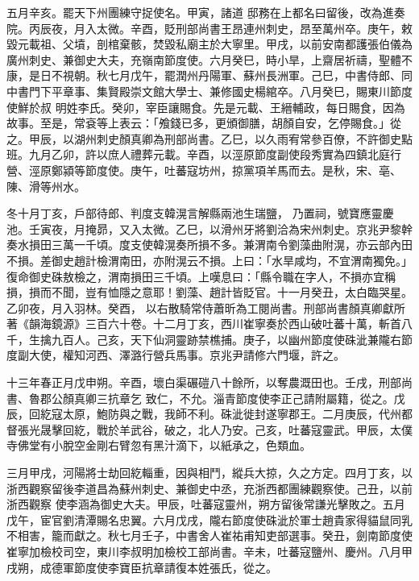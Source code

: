 \begin{pinyinscope}
 五月辛亥。罷天下州團練守捉使名。甲寅，諸道
 邸務在上都名曰留後，改為進奏院。丙辰夜，月入太微。辛酉，貶刑部尚書王昂連州刺史，昂至萬州卒。庚午，敕毀元載祖、父墳，剖棺棄骸，焚毀私廟主於大寧里。甲戌，以前安南都護張伯儀為廣州刺史、兼御史大夫，充嶺南節度使。六月癸巳，時小旱，上齋居祈禱，聖體不康，是日不視朝。秋七月戊午，罷潤州丹陽軍、蘇州長洲軍。己巳，中書侍郎、同中書門下平章事、集賢殿崇文館大學士、兼修國史楊綰卒。八月癸巳，賜東川節度使鮮於叔
 明姓李氏。癸卯，宰臣讓賜食。先是元載、王縉輔政，每日賜食，因為故事。至是，常袞等上表云：「飧錢已多，更頒御膳，胡顏自安，乞停賜食。」從之。甲辰，以湖州刺史顏真卿為刑部尚書。乙巳，以久雨宥常參百僚，不許御史點班。九月乙卯，許以庶人禮葬元載。辛酉，以涇原節度副使段秀實為四鎮北庭行營、涇原鄭潁等節度使。庚午，吐蕃寇坊州，掠黨項羊馬而去。是秋，宋、亳、陳、滑等州水。



 冬十月丁亥，戶部待郎、判度支韓滉言解縣兩池生瑞鹽，
 乃置祠，號寶應靈慶池。壬寅夜，月掩昴，又入太微。乙巳，以滑州牙將劉洽為宋州刺史。京兆尹黎幹奏水損田三萬一千頃。度支使韓滉奏所損不多。兼渭南令劉藻曲附滉，亦云部內田不損。差御史趙計檢渭南田，亦附滉云不損。上曰：「水旱咸均，不宜渭南獨免。」復命御史硃敖檢之，渭南損田三千頃。上嘆息曰：「縣令職在字人，不損亦宜稱損，損而不聞，豈有恤隱之意耶！劉藻、趙計皆貶官。十一月癸丑，太白臨哭星。乙卯夜，月入羽林。癸酉，
 以右散騎常侍蕭昕為工閱尚書。刑部尚書顏真卿獻所著《韻海鏡源》三百六十卷。十二月丁亥，西川崔寧奏於西山破吐蕃十萬，斬首八千，生擒九百人。己亥，天下仙洞靈跡禁樵捕。庚子，以幽州節度使硃泚兼隴右節度副大使，權知河西、澤潞行營兵馬事。京兆尹請修六門堰，許之。



 十三年春正月戊申朔。辛酉，壞白渠碾磑八十餘所，以奪農溉田也。壬戌，刑部尚書、魯郡公顏真卿三抗章乞
 致仁，不允。淄青節度使李正己請附屬籍，從之。戊辰，回紇寇太原，鮑防與之戰，我師不利。硃泚徙封遂寧郡王。二月庚辰，代州都督張光晟擊回紇，戰於羊武谷，破之，北人乃安。己亥，吐蕃寇靈武。甲辰，太僕寺佛堂有小脫空金剛右臂忽有黑汁滴下，以紙承之，色類血。



 三月甲戌，河陽將士劫回紇輜重，因與相鬥，縱兵大掠，久之方定。四月丁亥，以浙西觀察留後李道昌為蘇州刺史、兼御史中丞，充浙西都團練觀察使。己丑，以前浙西觀察
 使李涵為御史大夫。甲辰，吐蕃寇靈州，朔方留後常謙光擊敗之。五月戊午，宦官劉清潭賜名忠翼。六月戊戌，隴右節度使硃泚於軍士趙貴家得貓鼠同乳不相害，籠而獻之。秋七月壬子，中書舍人崔祐甫知吏部選事。癸丑，劍南節度使崔寧加檢校司空，東川李叔明加檢校工部尚書。辛未，吐蕃寇鹽州、慶州。八月甲戌朔，成德軍節度使李寶臣抗章請復本姓張氏，從之。




\end{pinyinscope}
